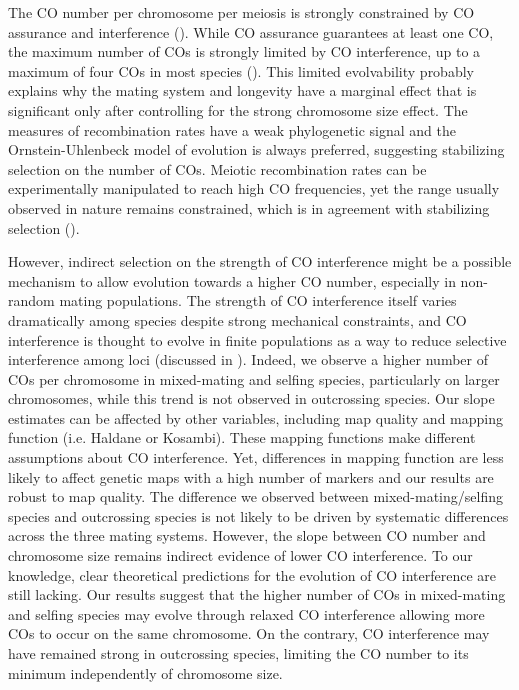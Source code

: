 \documentclass{article}
\begin{document}
The CO number per chromosome per meiosis is strongly constrained by CO assurance and interference (\cite{wangMeioticCrossoverPatterns2015}). While CO assurance guarantees at least one CO, the maximum number of COs is strongly limited by CO interference, up to a maximum of four COs in most species (\cite{brazierDiversityDeterminantsRecombination2022b,stapleyVariationRecombinationFrequency2017}). This limited evolvability probably explains why the mating system and longevity have a marginal effect that is significant only after controlling for the strong chromosome size effect. The measures of recombination rates have a weak phylogenetic signal and the Ornstein-Uhlenbeck model of evolution is always preferred, suggesting stabilizing selection on the number of COs. Meiotic recombination rates can be experimentally manipulated to reach high CO frequencies, yet the range usually observed in nature remains constrained, which is in agreement with stabilizing selection (\cite{serraMassiveCrossoverElevation2018}).


However, indirect selection on the strength of CO interference might be a possible mechanism to allow evolution towards a higher CO number, especially in non-random mating populations. The strength of CO interference itself varies dramatically among species despite strong mechanical constraints, and CO interference is thought to evolve in finite populations as a way to reduce selective interference among loci (discussed in \cite{ottoCrossoverInterferenceShedding2019}). Indeed, we observe a higher number of COs per chromosome in mixed-mating and selfing species, particularly on larger chromosomes, while this trend is not observed in outcrossing species. Our slope estimates can be affected by other variables, including map quality and mapping function (i.e. Haldane or Kosambi). These mapping functions make different assumptions about CO interference. Yet, differences in mapping function are less likely to affect genetic maps with a high number of markers and our results are robust to map quality. The difference we observed between mixed-mating/selfing species and outcrossing species is not likely to be driven by systematic differences across the three mating systems. However, the slope between CO number and chromosome size remains indirect evidence of lower CO interference. To our knowledge, clear theoretical predictions for the evolution of CO interference are still lacking. Our results suggest that the higher number of COs in mixed-mating and selfing species may evolve through relaxed CO interference allowing more COs to occur on the same chromosome. On the contrary, CO interference may have remained strong in outcrossing species, limiting the CO number to its minimum independently of chromosome size.
\end{document}
